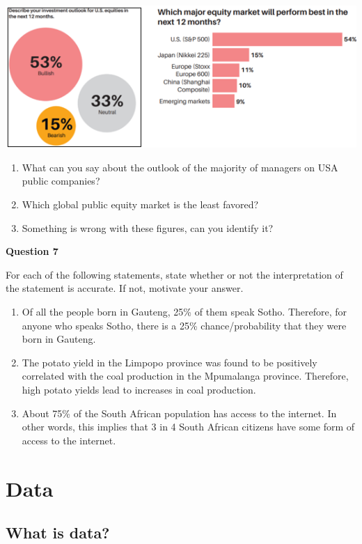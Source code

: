 \documentclass[
]{book}
\begin{document}
\includegraphics{images/Section 1 - 1.png}

\begin{enumerate}
\def\labelenumi{\alph{enumi}.}
\item
  What can you say about the outlook of the majority of managers on USA public companies?
\item
  Which global public equity market is the least favored?
\item
  Something is wrong with these figures, can you identify it?
\end{enumerate}

\textbf{Question 7}

For each of the following statements, state whether or not the interpretation of the statement is accurate. If not, motivate your answer.

\begin{enumerate}
\def\labelenumi{\alph{enumi}.}
\item
  Of all the people born in Gauteng, 25\% of them speak Sotho. Therefore, for anyone who speaks Sotho, there is a 25\% chance/probability that they were born in Gauteng.
\item
  The potato yield in the Limpopo province was found to be positively correlated with the coal production in the Mpumalanga province. Therefore, high potato yields lead to increases in coal production. ~
\item
  About 75\% of the South African population has access to the internet. In other words, this implies that 3 in 4 South African citizens have some form of access to the internet.
\end{enumerate}

\section{Data}\label{data}

\subsection{What is data?}\label{what-is-data}
\end{document}
